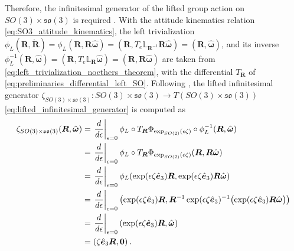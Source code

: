 Therefore, the infinitesimal generator of the lifted group action on $SO(3)\times\mathfrak{so}(3)$ is required \cite{Lee2008}. With the attitude kinematics relation \eqref{eq:SO3_attitude_kinematics}, the left trivialization $\phi_L(\bm{R},\dot{\bm{R}})=\phi_L(\bm{R},\bm{R}\hat{\bm{\omega}})=(\bm{R},T_e\mathbb{L}_{\bm{R}^{-1}}\bm{R}\hat{\bm{\omega}})=(\bm{R},\hat{\bm{\omega}})$, and its inverse $\phi_L^{-1}(\bm{R},\hat{\bm{\omega}})=(\bm{R},T_e\mathbb{L}_{\bm{R}}\hat{\bm{\omega}})=(\bm{R},\bm{R}\hat{\bm{\omega}})$ are taken from \eqref{eq:left_trivialization_noethers_theorem}, with the differential $T_{\bm{R}}$ of \eqref{eq:preliminaries_differential_left_SO}. Following \cite{Lee2008}, the lifted infinitesimal generator $\zeta_{SO(3) \times \mathfrak{so}(3)}:SO(3) \times \mathfrak{so}(3) \to T(SO(3) \times \mathfrak{so}(3))$ \eqref{eq:lifted_infinitesimal_generator} is computed as
\begin{align}
\zeta_{SO(3)\times\mathfrak{so}(3)}(\bm{R},\hat{\bm{\omega}})
&=
\left.\frac{d}{d\epsilon}\right|_{\epsilon=0}
\phi_L \circ T_{\bm{R}}\Phi_{\exp_{SO(2)}(\epsilon\zeta)}
\circ \phi_L^{-1}(\bm{R},\hat{\bm{\omega}}) \notag\\
&=
\left.\frac{d}{d\epsilon}\right|_{\epsilon=0}
\phi_L \circ T_{\bm{R}}\Phi_{\exp_{SO(2)}(\epsilon\zeta)}
(\bm{R},\bm{R}\hat{\bm{\omega}}) \notag\\
&=
\left.\frac{d}{d\epsilon}\right|_{\epsilon=0}
\phi_L\!\left(
\exp(\epsilon\zeta\hat{\bm{e}}_3)\bm{R},
\exp(\epsilon\zeta\hat{\bm{e}}_3)\bm{R}\hat{\bm{\omega}}
\right) \notag\\
&=
\left.\frac{d}{d\epsilon}\right|_{\epsilon=0}
\left(
\exp(\epsilon\zeta\hat{\bm{e}}_3)\bm{R},
\bm{R}^{-1}\exp(\epsilon\zeta\hat{\bm{e}}_3)^{-1}
\bigl(\exp(\epsilon\zeta\hat{\bm{e}}_3)\bm{R}\hat{\bm{\omega}}\bigr)
\right) \notag\\
&=
\left.\frac{d}{d\epsilon}\right|_{\epsilon=0}
\left(
\exp(\epsilon\zeta\hat{\bm{e}}_3)\bm{R},
\hat{\bm{\omega}}
\right) \notag\\
&=
\left(
\zeta\hat{\bm{e}}_3\bm{R},
\bm{0}
\right).
\label{eq:continuous_3D_pendulum_lifted_generator}
\end{align}

